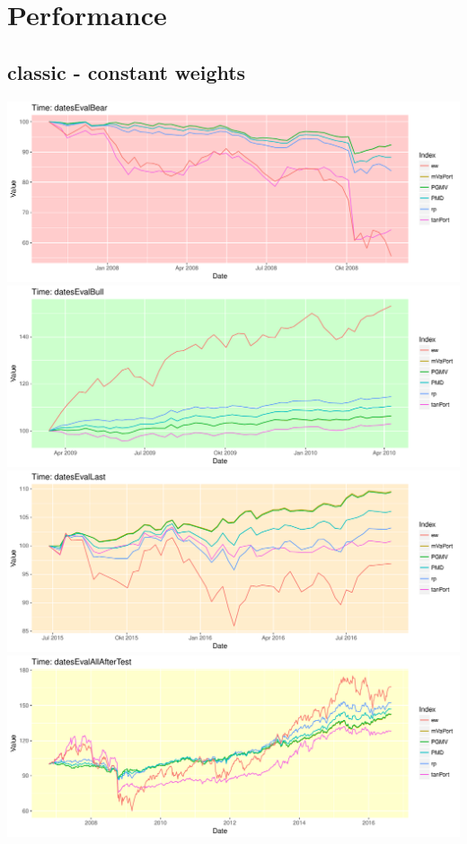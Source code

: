 \documentclass{scrbook}
\begin{document}
\clearpage
\section{Performance}

\subsection{classic - constant weights}
\includegraphics[width=\textwidth]{Performance-Classic-datesEvalBear.pdf}
\includegraphics[width=\textwidth]{Performance-Classic-datesEvalBull.pdf}
\includegraphics[width=\textwidth]{Performance-Classic-datesEvalLast.pdf}
\includegraphics[width=\textwidth]{Performance-Classic-datesEvalAllAfterTest.pdf}
\end{document}
